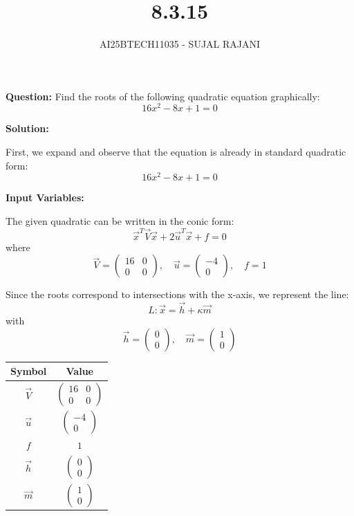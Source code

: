 \documentclass[journal,12pt,onecolumn]{IEEEtran}
\begin{document}
\title{8.3.15}
\author{AI25BTECH11035 - SUJAL RAJANI}
{\let\newpage\relax\maketitle}
\textbf{Question:} Find the roots of the following quadratic equation graphically:
\[
16x^2 - 8x + 1 = 0
\]

\textbf{Solution:}

First, we expand and observe that the equation is already in standard quadratic form:
\[
16x^2 - 8x + 1 = 0
\]

\textbf{Input Variables:}

The given quadratic can be written in the conic form:
\[
\vec{x}^T\vec{V}\vec{x} + 2\vec{u}^T\vec{x} + f = 0
\]
where
\[
\vec{V} = \begin{pmatrix} 16 & 0 \\ 0 & 0 \end{pmatrix}, \quad
\vec{u} = \begin{pmatrix} -4 \\ 0 \end{pmatrix}, \quad
f = 1
\]

Since the roots correspond to intersections with the x-axis, we represent the line:
\[
L : \vec{x} = \vec{h} + \kappa\vec{m}
\]
with
\[
\vec{h} = \begin{pmatrix} 0 \\ 0 \end{pmatrix}, \quad
\vec{m} = \begin{pmatrix} 1 \\ 0 \end{pmatrix}
\]

\begin{longtable}{|c|c|}
\hline
\textbf{Symbol} & \textbf{Value} \\
\hline
$\vec{V}$ & $\begin{pmatrix} 16 & 0 \\ 0 & 0 \end{pmatrix}$ \\
\hline
$\vec{u}$ & $\begin{pmatrix} -4 \\ 0 \end{pmatrix}$ \\
\hline
$f$ & $1$ \\
\hline
$\vec{h}$ & $\begin{pmatrix} 0 \\ 0 \end{pmatrix}$ \\
\hline
$\vec{m}$ & $\begin{pmatrix} 1 \\ 0 \end{pmatrix}$ \\
\hline
\end{longtable}
\end{document}
